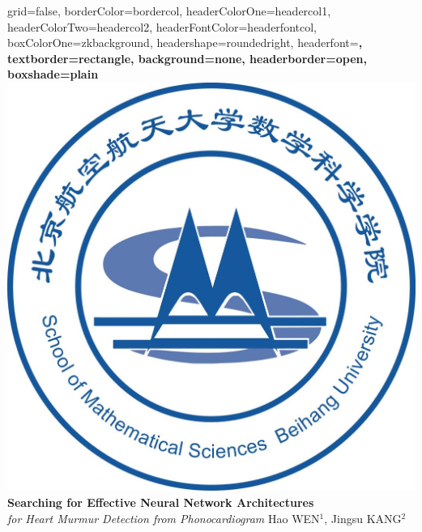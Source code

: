 \documentclass[a0paper,portrait]{baposter}
\begin{document}

\begin{poster}{
grid=false,
borderColor=bordercol, %
headerColorOne=headercol1, %
headerColorTwo=headercol2, %
headerFontColor=headerfontcol, %
boxColorOne=zkbackground,
headershape=roundedright, %
headerfont=\Large\sf\bf, %
textborder=rectangle,
background=none,
headerborder=open, %
boxshade=plain
}
%
%
{\includegraphics[scale=0.090]{logo_buaa_math.jpg}} %
{
{\bf \fontsize{19pt}{19pt} \selectfont Searching for Effective Neural Network Architectures} \\
{\it \LARGE  for Heart Murmur Detection from Phonocardiogram}
} %
{\vspace{0.3em} \smaller Hao WEN$^1$, Jingsu KANG$^2$  \\  %

}
\end{poster}
\end{document}
